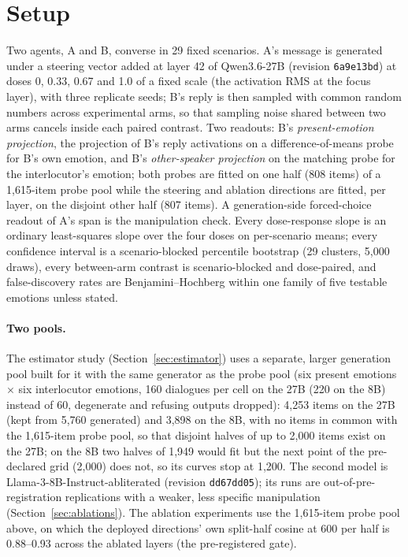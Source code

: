 \documentclass[11pt]{article}
\begin{document}
\section{Setup}
\label{sec:setup}
Two agents, A and B, converse in 29 fixed scenarios. A's message is generated under a steering vector added at layer 42 of Qwen3.6-27B (revision \texttt{6a9e13bd}) at doses 0, 0.33, 0.67 and 1.0 of a fixed scale (the activation RMS at the focus layer), with three replicate seeds; B's reply is then sampled with common random numbers across experimental arms, so that sampling noise shared between two arms cancels inside each paired contrast. Two readouts: B's \emph{present-emotion projection}, the projection of B's reply activations on a difference-of-means probe for B's own emotion, and B's \emph{other-speaker projection} on the matching probe for the interlocutor's emotion; both probes are fitted on one half (808 items) of a 1,615-item probe pool while the steering and ablation directions are fitted, per layer, on the disjoint other half (807 items). A generation-side forced-choice readout of A's span is the manipulation check. Every dose-response slope is an ordinary least-squares slope over the four doses on per-scenario means; every confidence interval is a scenario-blocked percentile bootstrap \citep{efron1993bootstrap} (29 clusters, 5,000 draws), every between-arm contrast is scenario-blocked and dose-paired, and false-discovery rates are Benjamini--Hochberg \citep{benjamini1995fdr} within one family of five testable emotions unless stated.

\paragraph{Two pools.} The estimator study (Section~\ref{sec:estimator}) uses a separate, larger generation pool built for it with the same generator as the probe pool (six present emotions $\times$ six interlocutor emotions, 160 dialogues per cell on the 27B (220 on the 8B) instead of 60, degenerate and refusing outputs dropped): 4,253 items on the 27B (kept from 5,760 generated) and 3,898 on the 8B, with no items in common with the 1,615-item probe pool, so that disjoint halves of up to 2,000 items exist on the 27B; on the 8B two halves of 1,949 would fit but the next point of the pre-declared grid (2,000) does not, so its curves stop at 1,200. The second model is Llama-3-8B-Instruct-abliterated (revision \texttt{dd67dd05}); its runs are out-of-pre-registration replications with a weaker, less specific manipulation (Section~\ref{sec:ablations}). The ablation experiments use the 1,615-item probe pool above, on which the deployed directions' own split-half cosine at 600 per half is 0.88--0.93 across the ablated layers (the pre-registered gate).
\end{document}

